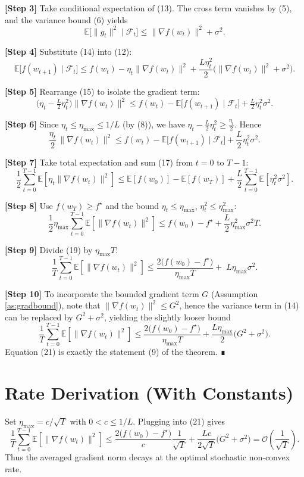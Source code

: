 \documentclass{article}
\newcommand{\E}{\mathbb{E}}
\begin{document}
\noindent\textbf{[Step 3]} Take conditional expectation of (13). The cross term vanishes by (5), and the variance bound (6) yields
\[
\E\!\bigl[\|g_t\|^{2}\mid\mathcal{F}_t\bigr]
\le\|\nabla f(w_t)\|^{2}+\sigma^{2}.
\tag{14}
\]

\noindent\textbf{[Step 4]} Substitute (14) into (12):
\[
\E\!\bigl[f(w_{t+1})\mid\mathcal{F}_t\bigr]
\le f(w_t)-\eta_t\|\nabla f(w_t)\|^{2}
+\frac{L\eta_t^{2}}{2}\bigl(\|\nabla f(w_t)\|^{2}+\sigma^{2}\bigr).
\tag{15}
\]

\noindent\textbf{[Step 5]} Rearrange (15) to isolate the gradient term:
\[
\bigl(\eta_t-\tfrac{L}{2}\eta_t^{2}\bigr)\|\nabla f(w_t)\|^{2}
\le f(w_t)-\E\!\bigl[f(w_{t+1})\mid\mathcal{F}_t\bigr]
+\tfrac{L}{2}\eta_t^{2}\sigma^{2}.
\tag{16}
\]

\noindent\textbf{[Step 6]} Since $\eta_t\le\eta_{\max}\le 1/L$ (by (8)), we have $\eta_t-\frac{L}{2}\eta_t^{2}\ge\frac{\eta_t}{2}$. Hence
\[
\frac{\eta_t}{2}\,\|\nabla f(w_t)\|^{2}
\le f(w_t)-\E\!\bigl[f(w_{t+1})\mid\mathcal{F}_t\bigr]
+\frac{L}{2}\eta_t^{2}\sigma^{2}.
\tag{17}
\]

\noindent\textbf{[Step 7]} Take total expectation and sum (17) from $t=0$ to $T-1$:
\[
\frac{1}{2}\sum_{t=0}^{T-1}\E[\eta_t\|\nabla f(w_t)\|^{2}]
\le \E[f(w_0)]-\E[f(w_T)]
+\frac{L}{2}\sum_{t=0}^{T-1}\E[\eta_t^{2}\sigma^{2}].
\tag{18}
\]

\noindent\textbf{[Step 8]} Use $f(w_T)\ge f^{\star}$ and the bound $\eta_t\le\eta_{\max}$, $\eta_t^{2}\le\eta_{\max}^{2}$:
\[
\frac{1}{2}\eta_{\max}\sum_{t=0}^{T-1}\E[\|\nabla f(w_t)\|^{2}]
\le f(w_0)-f^{\star}
+\frac{L}{2}\eta_{\max}^{2}\sigma^{2}T.
\tag{19}
\]

\noindent\textbf{[Step 9]} Divide (19) by $\eta_{\max}T$:
\[
\frac{1}{T}\sum_{t=0}^{T-1}\E[\|\nabla f(w_t)\|^{2}]
\le
\frac{2\bigl(f(w_0)-f^{\star}\bigr)}{\eta_{\max}T}
+\;L\eta_{\max}\sigma^{2}.
\tag{20}
\]

\noindent\textbf{[Step 10]} To incorporate the bounded gradient term $G$ (Assumption \ref{as:gradbound}), note that $\|\nabla f(w_t)\|^{2}\le G^{2}$, hence the variance term in (14) can be replaced by $G^{2}+\sigma^{2}$, yielding the slightly looser bound
\[
\frac{1}{T}\sum_{t=0}^{T-1}\E[\|\nabla f(w_t)\|^{2}]
\le
\frac{2\bigl(f(w_0)-f^{\star}\bigr)}{\eta_{\max}T}
+\frac{L\eta_{\max}}{2}\bigl(G^{2}+\sigma^{2}\bigr).
\tag{21}
\]
Equation (21) is exactly the statement (9) of the theorem. ∎

\section*{Rate Derivation (With Constants)}
Set $\eta_{\max}=c/\sqrt{T}$ with $0<c\le 1/L$.
Plugging into (21) gives
\[
\frac{1}{T}\sum_{t=0}^{T-1}\E[\|\nabla f(w_t)\|^{2}]
\le
\frac{2\bigl(f(w_0)-f^{\star}\bigr)}{c}\frac{1}{\sqrt{T}}
+\frac{L c}{2\sqrt{T}}\bigl(G^{2}+\sigma^{2}\bigr)
= \mathcal{O}\!\left(\frac{1}{\sqrt{T}}\right).
\tag{22}
\]
Thus the averaged gradient norm decays at the optimal stochastic non‑convex rate.
\end{document}
